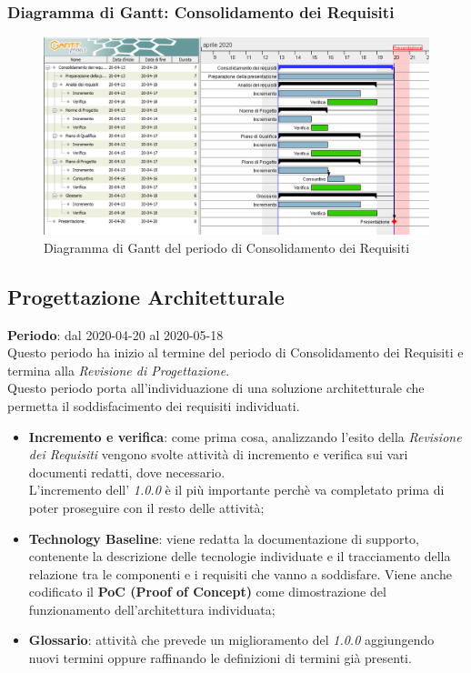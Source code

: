 	\subsubsection{Diagramma di Gantt: Consolidamento dei Requisiti}
		\begin{figure}[h]
			\centering
			\includegraphics[width=1.1\textwidth]{./res/img/DiagrammiGantt/cons_req_gantt.png}
			\caption{Diagramma di Gantt del periodo di Consolidamento dei Requisiti}
		\end{figure}
\newpage
\subsection{Progettazione Architetturale}
\textbf{Periodo}: dal 2020-04-20 al 2020-05-18 \\
Questo periodo ha inizio al termine del periodo di Consolidamento dei Requisiti e termina alla \textit{Revisione di Progettazione}. \\
Questo periodo porta all'individuazione di una soluzione architetturale che permetta il soddisfacimento dei requisiti individuati.
\begin{itemize}
	\item \textbf{Incremento e verifica}: come prima cosa, analizzando l'esito della \textit{Revisione dei Requisiti} vengono svolte attività di incremento e verifica sui vari documenti redatti, dove necessario. \\
	L'incremento dell'\textit{\AdR{} 1.0.0} è il più importante perchè va completato prima di poter proseguire con il resto delle attività;
	\item \textbf{Technology Baseline}: viene redatta la documentazione di supporto, contenente la descrizione delle tecnologie individuate e il tracciamento della relazione tra le componenti e i requisiti che vanno a soddisfare. Viene anche codificato il \textbf{PoC (Proof of Concept)} come dimostrazione del funzionamento dell'architettura individuata;
	\item \textbf{Glossario}: attività che prevede un miglioramento del \textit{\Glossario{} 1.0.0} aggiungendo nuovi termini oppure raffinando le definizioni di termini già presenti.
\end{itemize}
